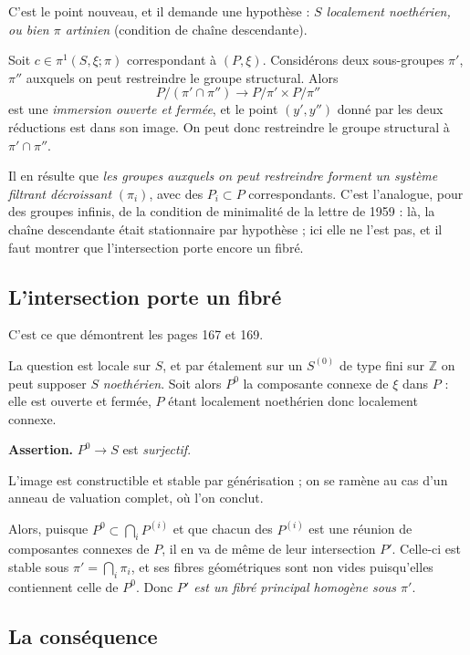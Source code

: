 \documentclass[11pt,a4paper]{article}
\begin{document}
C'est le point nouveau, et il demande une hypothèse : \emph{$S$ localement
noethérien, ou bien $\pi$ artinien} (condition de chaîne descendante).

Soit $c \in \pi^{1}(S,\xi;\pi)$ correspondant à $(P, \xi)$. Considérons deux
sous-groupes $\pi'$, $\pi''$ auxquels on peut restreindre le groupe structural.
Alors
\[
  P/(\pi' \cap \pi'') \longrightarrow P/\pi' \times P/\pi''
\]
est une \emph{immersion ouverte et fermée}, et le point $(y', y'')$ donné par
les deux réductions est dans son image. On peut donc restreindre le groupe
structural à $\pi' \cap \pi''$.

Il en résulte que \emph{les groupes auxquels on peut restreindre forment un
système filtrant décroissant} $(\pi_{i})$, avec des $P_{i} \subset P$
correspondants. C'est l'analogue, pour des groupes infinis, de la condition de
minimalité de la lettre de 1959 : là, la chaîne descendante était stationnaire
par hypothèse ; ici elle ne l'est pas, et il faut montrer que l'intersection
porte encore un fibré.

\subsection*{L'intersection porte un fibré}

C'est ce que démontrent les pages 167 et 169.

La question est locale sur $S$, et par étalement sur un $S^{(0)}$ de type fini
sur $\mathbb{Z}$ on peut supposer $S$ \emph{noethérien}. Soit alors $P^{0}$ la
composante connexe de $\xi$ dans $P$ : elle est ouverte et fermée, $P$ étant
localement noethérien donc localement connexe.

\textbf{Assertion.} $P^{0} \to S$ est \emph{surjectif}.

L'image est constructible et stable par générisation ; on se ramène au cas d'un
anneau de valuation complet, où l'on conclut.

Alors, puisque $P^{0} \subset \bigcap_{i} P^{(i)}$ et que chacun des $P^{(i)}$
est une réunion de composantes connexes de $P$, il en va de même de leur
intersection $P'$. Celle-ci est stable sous $\pi' = \bigcap_{i} \pi_{i}$, et
ses fibres géométriques sont non vides puisqu'elles contiennent celle de
$P^{0}$. Donc \emph{$P'$ est un fibré principal homogène sous $\pi'$}.

\subsection*{La conséquence}
\end{document}
